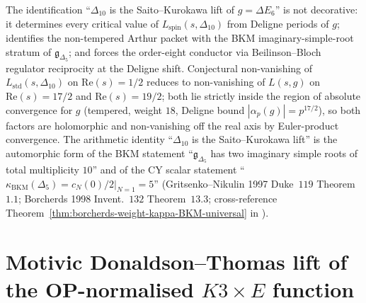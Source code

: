 \begin{remark}[Arithmetic consequences: Deligne periods, BKM imaginary simple roots, \texorpdfstring{$K^{\kappa_{\mathrm{ch}}} = 8$}{K-kappa-ch = 8} ceiling]
\begin{description}
\end{description}
The identification ``$\Delta_{10}$ is the Saito--Kurokawa lift of $g = \Delta E_6$'' is not decorative: it determines every critical value of $L_{\mathrm{spin}}(s, \Delta_{10})$ from Deligne periods of $g$; identifies the non-tempered Arthur packet with the BKM imaginary-simple-root stratum of $\mathfrak{g}_{\Delta_5}$; and forces the order-eight conductor via Beilinson--Bloch regulator reciprocity at the Deligne shift. Conjectural non-vanishing of $L_{\mathrm{std}}(s, \Delta_{10})$ on $\mathrm{Re}(s) = 1/2$ reduces to non-vanishing of $L(s, g)$ on $\mathrm{Re}(s) = 17/2$ and $\mathrm{Re}(s) = 19/2$; both lie strictly inside the region of absolute convergence for $g$ (tempered, weight $18$, Deligne bound $|\alpha_p(g)| = p^{17/2}$), so both factors are holomorphic and non-vanishing off the real axis by Euler-product convergence. The arithmetic identity ``$\Delta_{10}$ is the Saito--Kurokawa lift'' is the automorphic form of the BKM statement ``$\mathfrak{g}_{\Delta_5}$ has two imaginary simple roots of total multiplicity $10$'' and of the CY scalar statement ``$\kappa_{\mathrm{BKM}}(\Delta_5) = \left.c_N(0)/2\right|_{N=1} = 5$'' \textup{(}Gritsenko--Nikulin 1997 Duke~$119$ Theorem~$1.1$; Borcherds 1998 Invent.~$132$ Theorem~$13.3$; cross-reference Theorem~\ref{thm:borcherds-weight-kappa-BKM-universal} in \cite{VolI}\textup{)}.
\end{remark}

\section{Motivic Donaldson--Thomas lift of the OP-normalised \texorpdfstring{$K3\times E$}{K3x E} function}
\label{sec:k3e-cy3-motivic-dt-lift}


